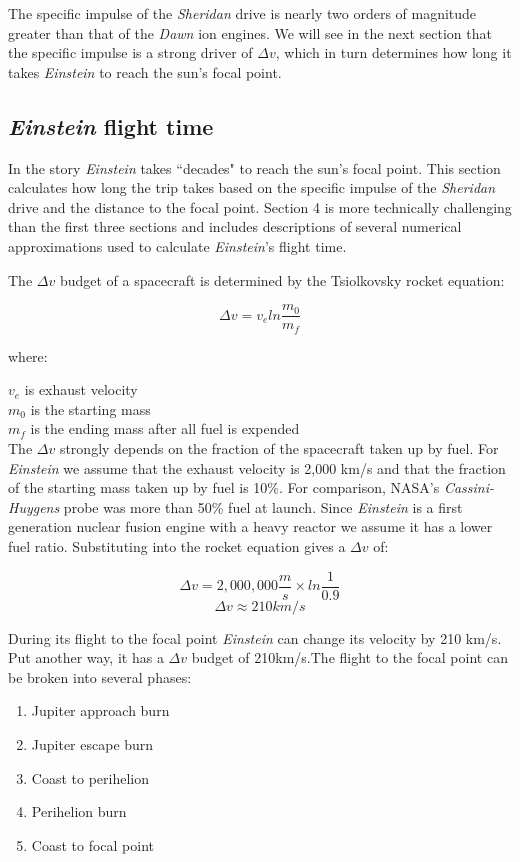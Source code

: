 \documentclass[12pt]{article} %
\begin{document}
The specific impulse of the \textit{Sheridan} drive is nearly two orders of magnitude greater than that of the \textit{Dawn} ion engines. We will see in the next section that the specific impulse is a strong driver of $\Delta v$, which in turn determines how long it takes \textit{Einstein} to reach the sun's focal point.

\subsection{\textit{Einstein} flight time}
\label{subsec: flight time}
In the story \textit{Einstein} takes ``decades" to reach the sun's focal point. This section calculates how long the trip takes based on the specific impulse of the \textit{Sheridan} drive and the distance to the focal point. Section 4 is more technically challenging than the first three sections and includes descriptions of several numerical approximations used to calculate \textit{Einstein}'s flight time.

The $\Delta v$ budget of a spacecraft is determined by the Tsiolkovsky rocket equation:

$$\Delta v = v_e ln \frac{m_0}{m_f}$$

where:

$v_e$ is exhaust velocity\\
$m_0$ is the starting mass\\
$m_f$ is the ending mass after all fuel is expended\\

The $\Delta v$ strongly depends on the fraction of the spacecraft taken up by fuel. For \textit{Einstein} we assume that the exhaust velocity is 2,000 km/s and that the fraction of the starting mass taken up by fuel is 10\%. For comparison, NASA's \textit{Cassini-Huygens} probe was more than 50\% fuel at launch. Since \textit{Einstein} is a first generation nuclear fusion engine with a heavy reactor we assume it has a lower fuel ratio. Substituting into the rocket equation gives a $\Delta v$ of:

$$\Delta v = 2,000,000\frac{m}{s} \times ln \frac{1}{0.9}$$
$$\Delta v \approx 210 km/s$$ 

During its flight to the focal point \textit{Einstein} can change its velocity by 210 km/s. Put another way, it has a $\Delta v$ budget of 210km/s.The flight to the focal point can be broken into several phases:
\begin{enumerate}
\item Jupiter approach burn
\item Jupiter escape burn
\item Coast to perihelion
\item Perihelion burn
\item Coast to focal point
\end{enumerate}
\end{document}
